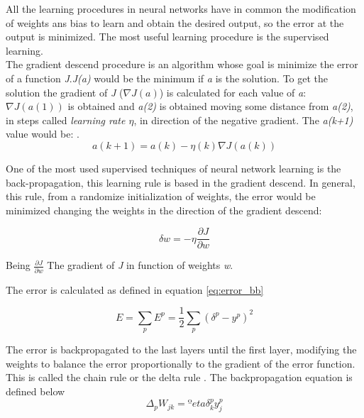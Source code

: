 All the learning procedures in neural networks have in common the modification of weights ans bias to learn and obtain the desired output, so the error at the output is minimized. The most useful learning procedure is the supervised learning.\\

The gradient descend procedure is an algorithm whose goal is minimize the error of a function \textit{J}.\textit{J(a)} would be the minimum if \textit{a} is the solution. To get the solution the gradient of \textit{J} ($\nabla J(a)$) is calculated for each value of \textit{a}: $\nabla J(a(1))$ is obtained and \textit{a(2)} is obtained moving some distance from \textit{a(2)}, in steps called \textit{learning rate $\eta$}, in direction of the negative gradient. The \textit{a(k+1)} value would be: \cite{Duda}.\\


\begin{equation}
a(k+1) = a(k) - \eta (k) \nabla J(a(k))
\end{equation}

One of the most used supervised techniques of neural network learning is the back-propagation, this learning rule is based in the gradient descend. In general, this rule, from a randomize initialization of weights, the error would be minimized changing the weights in the direction of the gradient descend:

\begin{equation}
\delta w = -\eta\frac{\partial J}{\partial w}
\end{equation}

Being $\frac{\partial J}{\partial w}$ The gradient of \textit{J} in function of weights \textit{w}.

The error is calculated as defined in equation \ref{eq:error_bb}

\begin{equation}
E=\sum_{p}E^p = \frac{1}{2}\sum_{p}(\delta^p- y^p)^2
\end{equation} \label{eq:error_bb}

The error is backpropagated to the last layers until the first layer, modifying the weights to balance the error proportionally to the gradient of the error function. This is called the chain rule or the delta rule \cite{Duda, BINN, krose}. The backpropagation equation is defined below\\

			\begin{equation}
			\Delta_{p}W_{jk}=ºeta \delta _{k}^{p}y_{j}^{p}
			\label{eq:ecuation_back1}
			\end{equation}\\

